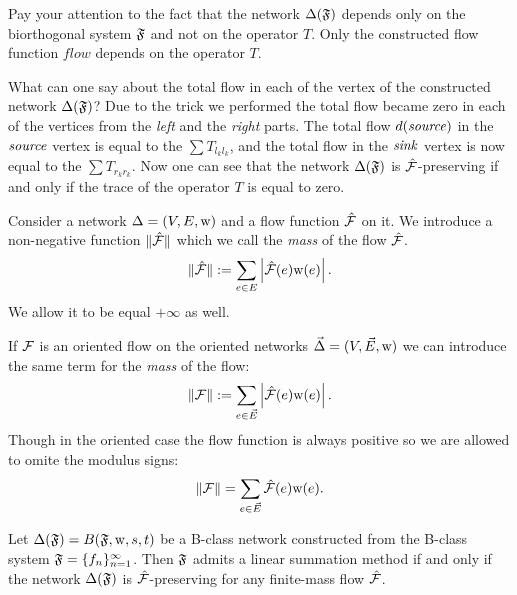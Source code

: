 \documentclass[12pt]{article}
\begin{document}
    \begin{remark}
      Pay your attention to the fact that the network $\Delta(\mathfrak{F})$
      depends only on the biorthogonal system $\mathfrak{F}$ and not on the operator $T$.
      Only the constructed flow function $flow$ depends on the operator $T$.
    \end{remark}
    What can one say about the total flow in each of the vertex of the constructed network $\Delta(\mathfrak{F})$?
    Due to the trick we performed the total flow became zero in each of the vertices from the \emph{left} and the \emph{right} parts.
    The total flow $d(\mathit{source})$ in the $\mathit{source}$ vertex is equal to the $\sum T_{l_k l_k}$, and the total flow in the
    $\mathit{sink}$ vertex is now equal to the $\sum T_{r_k r_k}$.
    Now one can see that the network $\Delta(\mathfrak{F})$ is $\mathcal{\hat{F}}$-preserving if and only if the trace of the operator $T$ is equal to
    zero.
    \begin{definition}
      Consider a network $\Delta = (V, E, \mathrm{w})$ and a flow function $\mathcal{\hat{F}}$ on it.
      We introduce a non-negative function $\|\mathcal{\hat{F}}\|$ which we call the \emph{mass} of the flow $\mathcal{\hat{F}}$.
      \[
        \|\mathcal{\hat{F}}\| := \sum_{e \in E} \left|\mathcal{\hat{F}}(e) \mathrm{w}(e)\right|.
      \]
      We allow it to be equal $+\infty$ as well.
    \end{definition}
    \begin{definition}
      If $\mathcal{F}$ is an oriented flow on the oriented networks $\vec{\Delta} = (V,\vec{E},\mathrm{w})$ 
        we can introduce the same term for the \emph{mass} of the flow:
      \[
        \|\mathcal{F}\| := \sum_{e \in \vec{E}} \left|\mathcal{\hat{F}}(e) \mathrm{w}(e)\right|.
      \]
      Though in the oriented case the flow function is always positive
        so we are allowed to omite the modulus signs:
      \[
        \|\mathcal{F}\| = \sum_{e \in \vec{E}} \mathcal{\hat{F}}(e) \mathrm{w}(e).
      \]
    \end{definition}
    \begin{theorem}
      \label{thm-graph-eq}
        Let $\Delta(\mathfrak{F}) = B(\mathfrak{F}, \mathrm{w}, s, t)$ be a B-class network constructed
          from the B-class system $\mathfrak{F} = \{{f}_n\}_{n=1}^\infty$.
        Then $\mathfrak{F}$ admits a linear summation method if and only if
          the network $\Delta(\mathfrak{F})$ is $\mathcal{\hat{F}}$-preserving for any
          finite-mass flow $\mathcal{\hat{F}}$.
    \end{theorem}
\end{document}
